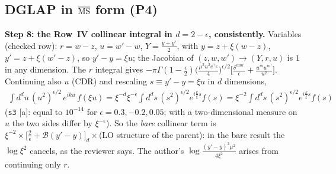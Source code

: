 \subsection{DGLAP in $\overline{\rm MS}$ form (P4)}

\noindent\textbf{Step 8: the Row~IV collinear integral in $d=2-\epsilon$, consistently.} Variables (checked row): $r=w-z$, $u=w'-w$, $Y=\frac{y+y'}{2}$, with $y=z+\xi(w-z)$, $y'=z+\xi(w'-z)$, so $y'-y=\xi u$; the Jacobian of $(z,w,w')\to(Y,r,u)$ is $1$ in any dimension. The $r$ integral gives $-\pi\Gamma(1-\frac{\epsilon}{2})\big(\frac{\mu^{2}u^{2}e^{\gamma_{E}}}{4}\big)^{\epsilon/2}\big[\frac{\delta^{mm'}}{\epsilon}+\frac{u^{m}u^{m'}}{u^{2}}\big]$. Continuing also $u$ (CDR) and rescaling $s\equiv y'-y=\xi u$ in $d$ dimensions,
\begin{align}
\int d^{d}u\,(u^{2})^{\epsilon/2}\,e^{iku}\,f(\xi u)=\xi^{-d}\xi^{-\epsilon}\int d^{d}s\,(s^{2})^{\epsilon/2}e^{i\frac{k}{\xi}s}f(s)=\xi^{-2}\int d^{d}s\,(s^{2})^{\epsilon/2}e^{i\frac{k}{\xi}s}f(s)
\label{eq:pd-resc}
\end{align}
(\texttt{s3} [a]: equal to $10^{-14}$ for $\epsilon=0.3,-0.2,0.05$; with a two-dimensional measure on $u$ the two sides differ by $\xi^{-\epsilon}$). So the \emph{bare} collinear term is $\xi^{-2}\times\big[\frac{2}{\epsilon}+\mathcal{B}(y'-y)\big]_{d}\times$(LO structure of the parent): in the bare result the $\log\xi^{2}$ cancels, as the reviewer says. The author's $\log\frac{(y'-y)^{2}\mu^{2}}{4\xi^{2}}$ arises from continuing only $r$.

